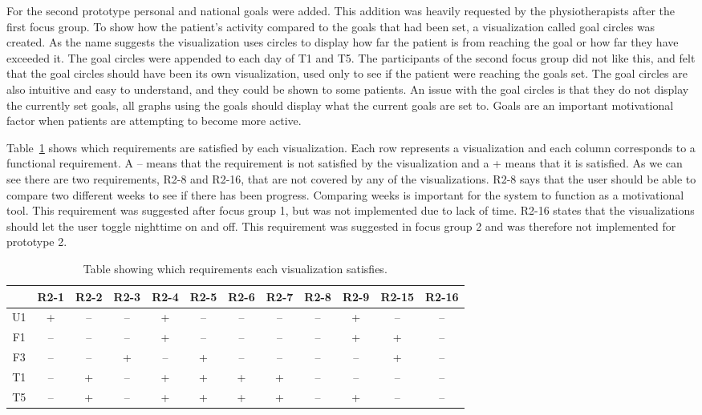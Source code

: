 For the second prototype personal and national goals were added. This addition was heavily requested by the physiotherapists after the first focus group. To show how the patient's activity compared to the goals that had been set, a visualization called goal circles was created. As the name suggests the visualization uses circles to display how far the patient is from reaching the goal or how far they have exceeded it. The goal circles were appended to each day of T1 and T5. The participants of the second focus group did not like this, and felt that the goal circles should have been its own visualization, used only to see if the patient were reaching the goals set. The goal circles are also intuitive and easy to understand, and they could be shown to some patients. An issue with the goal circles is that they do not display the currently set goals, all graphs using the goals should display what the current goals are set to. Goals are an important motivational factor when patients are attempting to become more active.

Table~\ref{tab:reqSat} shows which requirements are satisfied by each visualization. Each row represents a visualization and each column corresponds to a functional requirement. A -- means that the requirement is not satisfied by the visualization and a + means that it is satisfied. As we can see there are two requirements, R2-8 and R2-16, that are not covered by any of the visualizations. R2-8 says that the user should be able to compare two different weeks to see if there has been progress. Comparing weeks is important for the system to function as a motivational tool. This requirement was suggested after focus group 1, but was not implemented due to lack of time. R2-16 states that the visualizations should let the user toggle nighttime on and off. This requirement was suggested in focus group 2 and was therefore not implemented for prototype 2.

\begin{table}[h!]
  \centering
  \begin{tabular}{|c|c|c|c|c|c|c|c|c|c|c|c|}
    \hline
    & R2-1 & R2-2 & R2-3 & R2-4 & R2-5 & R2-6 & R2-7 & R2-8 & R2-9 & R2-15 & R2-16 \\ \hline
    U1 & + & -- & -- & + & -- & -- & -- & -- & + & -- & -- \\ \hline
    F1 & -- & -- & -- & + & -- & -- & -- & -- & + & + & -- \\ \hline
    F3 & -- & -- & + & -- & + & -- & -- & -- & -- & + & -- \\ \hline
    T1 & -- & + & -- & + & + & + & + & -- & -- & -- & -- \\ \hline
    T5 & -- & + & -- & + & + & + & + & -- & + & -- & -- \\ \hline
  \end{tabular}
  \caption{Table showing which requirements each visualization satisfies.}
  \label{tab:reqSat}
\end{table} 

